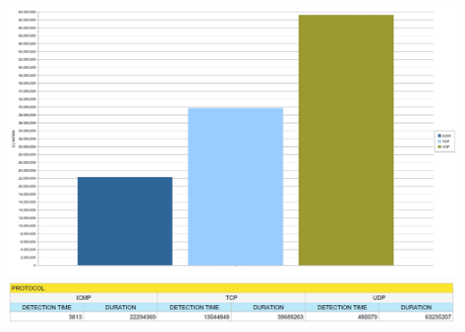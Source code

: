 \includegraphics[scale=0.3]{figure/duration_protocol.jpg}\\

\includegraphics[scale=0.4]{figure/tabella_protocolli.jpg}
